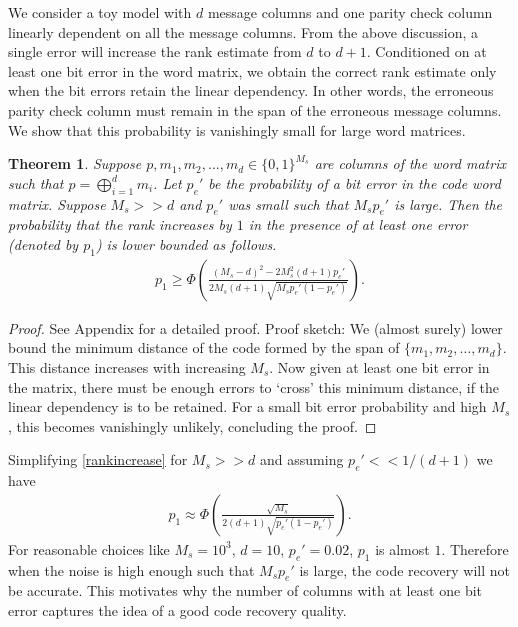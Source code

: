\documentclass[conference]{IEEEtran}
\newtheorem{theorem}{Theorem}
\begin{document}
We consider a toy model with $d$ message columns and one parity check column linearly dependent on all the message columns. From the above discussion, a single error will increase the rank estimate from $d$ to $d+1$. Conditioned on at least one bit error in the word matrix, we obtain the correct rank estimate only when the bit errors retain the linear dependency. In other words, the erroneous parity check column must remain in the span of the erroneous message columns. We show that this probability is vanishingly small for large word matrices.

\begin{theorem}
    Suppose $p, m_1, m_2, \ldots, m_d \in \{0, 1\}^{M_s}$ are columns of the word matrix such that $p = \bigoplus_{i=1}^d m_i$. Let $p_e'$ be the probability of a bit error in the code word matrix. Suppose $M_s >> d$ and $p_e'$ was small such that $M_sp_e'$ is large. Then the probability that the rank increases by $1$ in the presence of at least one error (denoted by $p_1$) is lower bounded as follows.
    \begin{align}\label{rankincrease}
        p_1 \geq \Phi \left(\frac{(M_s-d)^2 - 2M_s^2(d+1)p_e'}{2M_s(d+1)\sqrt{M_sp_e'(1-p_e')}}\right).
    \end{align}
\end{theorem}
\begin{proof}
    See Appendix for a detailed proof. 
    Proof sketch: We (almost surely) lower bound the minimum distance of the code formed by the span of $\{ m_1, m_2, \ldots, m_d\}$. This distance increases with increasing $M_s$. Now given at least one bit error in the matrix, there must be enough errors to `cross' this minimum distance, if the linear dependency is to be retained. For a small bit error probability and high $M_s$, this becomes vanishingly unlikely, concluding the proof.
\end{proof}


Simplifying  \eqref{rankincrease} for $M_s >> d$ and assuming $p_e' << 1/(d+1)$ we have
\begin{align*}
    p_1 \approx \Phi \left(\frac{\sqrt{M_s}}{2(d+1)\sqrt{p_e'(1-p_e')}}\right).
\end{align*}
For reasonable choices like $M_s = 10^3$, $d=10$, $p_e' = 0.02$, $p_1$ is almost $1$. Therefore when the noise is high enough such that $M_sp_e'$ is large, the code recovery will not be accurate. This motivates why the number of columns with at least one bit error captures the idea of a good code recovery quality.
\end{document}
